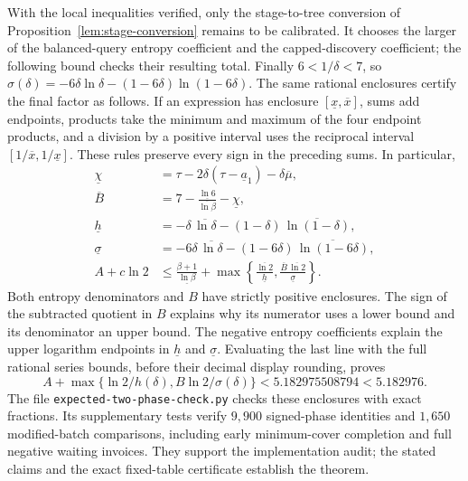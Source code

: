 With the local inequalities verified, only the stage-to-tree
conversion of Proposition~\ref{lem:stage-conversion} remains to be
calibrated. It chooses the larger of the
balanced-query entropy coefficient and the capped-discovery
coefficient; the following bound checks their resulting total.
Finally $6<1/\delta<7$, so
$\sigma(\delta)=-6\delta\ln\delta
 -(1-6\delta)\ln(1-6\delta)$. The same rational enclosures certify
the final factor as follows. If an expression has enclosure
$[\underline x,\overline x]$, sums add endpoints, products take
the minimum and maximum of the four endpoint products, and a
division by a positive interval uses the reciprocal interval
$[1/\overline x,1/\underline x]$. These rules preserve every sign
in the preceding sums. In particular,
\[
 \begin{aligned}
 \underline\chi
 &=\tau-2\delta(\tau-\underline a_1)-\delta\overline\mu,\\
 \overline B
 &=7-\frac{\underline{\ln6}}{\overline{\ln\beta}}-\underline\chi,\\
 \underline h
 &=-\delta\,\overline{\ln\delta}
       -(1-\delta)\,\overline{\ln(1-\delta)},\\
 \underline\sigma
 &=-6\delta\,\overline{\ln\delta}
       -(1-6\delta)\,\overline{\ln(1-6\delta)},\\
 A+c\ln2
 &\le\frac{\beta+1}{\underline{\ln\beta}}
    +\max\left\{\frac{\overline{\ln2}}{\underline h},
       \frac{\overline B\,\overline{\ln2}}{\underline\sigma}\right\}.
 \end{aligned}
\]
Both entropy denominators and $B$ have strictly positive enclosures.
The sign of the subtracted quotient in $B$ explains why its
numerator uses a lower bound and its denominator an upper bound.
The negative entropy coefficients explain the upper logarithm
endpoints in $\underline h$ and $\underline\sigma$. Evaluating
the last line with the full rational series bounds, before their
decimal display rounding, proves
\[
 \boxed{A+\max\{\ln2/h(\delta),B\ln2/\sigma(\delta)\}
       <5.182975508794<5.182976.}
\]
The file \texttt{expected-two-phase-}\allowbreak\texttt{check.py}
checks these enclosures with exact fractions. Its supplementary tests
verify $9{,}900$ signed-phase identities and $1{,}650$ modified-batch
comparisons, including early minimum-cover completion and full negative
waiting invoices. They support the implementation audit; the stated
claims and the exact fixed-table certificate establish the theorem.
